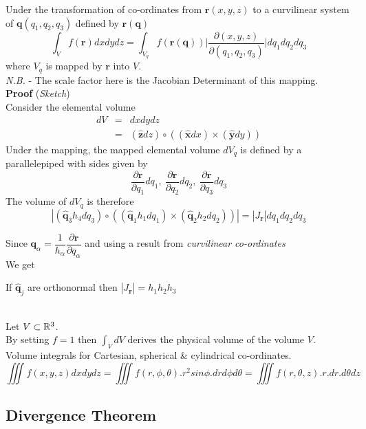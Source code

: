 \documentclass[11pt,a4paper]{article}
\begin{document}
Under the transformation of co-ordinates from $\textbf{r}(x,y,z)$ to a curvilinear system of $\textbf{q}(q_1,q_2,q_3)$ defined by $\textbf{r}(\textbf{q})$
$$\int_Vf(\textbf{r})dxdydz=\int_{V_q}f(\textbf{r}(\textbf{q}))\displaystyle{\bigg|\frac{\partial(x,y,z)}{\partial(q_1,q_2,q_3)}\bigg|}dq_1dq_2dq_3$$
where $V_q$ is mapped by $\textbf{r}$ into $V$.\\
\textit{N.B.} - The scale factor here is the Jacobian Determinant of this mapping.\\
\textbf{Proof} (\textit{Sketch})\\
Consider the elemental volume
\[\begin{array}{rcl}
dV&=&dxdydz\\
&=&(\hat{\textbf{z}}dz)\circ((\hat{\textbf{x}}dx)\times(\hat{\textbf{y}}dy))
\end{array}\]
Under the mapping, the mapped elemental volume $dV_q$ is defined by a parallelepiped with sides given by
$$\frac{\partial\textbf{r}}{\partial q_1}dq_1,\ \frac{\partial\textbf{r}}{\partial q_2}dq_2,\ \frac{\partial\textbf{r}}{\partial q_3}dq_3$$
The volume of $dV_q$ is therefore
$$|(\hat{\textbf{q}}_3h_4dq_3)\circ((\hat{\textbf{q}}_1h_1dq_1)\times(\hat{\textbf{q}}_2h_2dq_2))|=|J_\textbf{r}|dq_1dq_2dq_3$$

Since $\textbf{q}_\alpha=\dfrac{1}{h_\alpha}\dfrac{\partial\textbf{r}}{\partial q_\alpha}$ and using a result from \textit{curvilinear co-ordinates}\\
We get
\begin{center}If $\hat{\textbf{q}}_j$ are orthonormal then $|J_\textbf{r}|=h_1h_2h_3$\end{center}
\ \\

Let $V\subset\mathbb{R}^3$.\\
By setting $f=1$ then $\displaystyle{\int_VdV}$ derives the physical volume of the volume $V$.\\

Volume integrals for Cartesian, spherical \& cylindrical co-ordinates.
$$\iiint f(x,y,z)dxdydz=\iiint f(r,\phi,\theta).r^2sin\phi.drd\phi d\theta=\iiint f(r,\theta,z).r.dr.d\theta dz$$

\subsection{Divergence Theorem}
\end{document}
